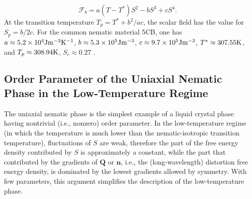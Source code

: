 \documentclass[nottitlepage]{article}
\begin{document}
\begin{equation}\label{eq:F333}
\mathcal{F}_{b}=a(T-T^{*}) S^2-bS^3+cS^4.
\end{equation}
At the transition temperature $T_p=T^{*}+b^2/ac$, the scalar field has the value for $S_p=b/2c$. For the common nematic material 5CB, one has $a\approx 5.2\times 10^{4}{\rm J\/}{\rm m\/}^{-3}{\rm K}^{-1}$, $b\approx 5.3\times 10^5{\rm J\/}{\rm m\/}^{-3}$, $c\approx 9.7\times 10^{5}{\rm J\/}{\rm m\/}^{-3}$, $T^*\approx 307.55{\rm K}$, and $T_p\approx 308.94{\rm K}$, $S_c\approx 0.27$ \cite{nita}.




\subsection {Order Parameter of the Uniaxial Nematic Phase in the Low-Temperature Regime}\label{sssec:uniaxial}
The uniaxial nematic phase is the simplest example of a liquid crystal phase having nontrivial (i.e., nonzero) order parameter. In the low-temperature regime (in which the temperature is much lower than the nematic-isotropic transition temperature), fluctuations of $S$ are weak, therefore the part of the free energy density contributed by $S$ is approximately a constant, while the part that contributed by the gradients of $\mathbf{Q}$ or $\mathbf{n}$, i.e., the (long-wavelength) distortion free energy density, is dominated by the lowest gradients allowed by symmetry. With few parameters, this argument simplifies the description of the low-temperature phase.
\end{document}
